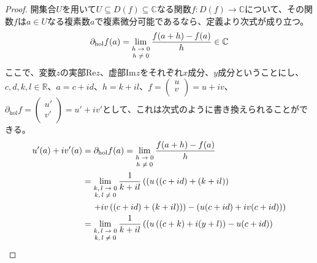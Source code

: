 \documentclass[dvipdfmx]{jsarticle}
\begin{document}
\begin{proof}
開集合$U$を用いて$U \subseteq D(f) \subseteq \mathbb{C}$なる関数$f:D(f) \rightarrow \mathbb{C}$について、その関数$f$は$a \in U$なる複素数$a$で複素微分可能であるなら、定義より次式が成り立つ。
\begin{align*}
\partial_{\mathrm{hol}}f(a) = \lim_{\scriptsize \begin{matrix}
h \rightarrow 0 \\
h \neq 0 \\
\end{matrix}}\frac{f(a + h) - f(a)}{h} \in \mathbb{C}
\end{align*}
ここで、変数$z$の実部$\mathrm{Re}z$、虚部$\mathrm{Im}z$をそれぞれ$x$成分、$y$成分ということにし、$c,d,k,l \in \mathbb{R}$、$a = c + id$、$h = k + il$、$f = \begin{pmatrix}
u \\
v \\
\end{pmatrix} = u + iv$、$\partial_{\mathrm{hol}}f = \begin{pmatrix}
u' \\
v' \\
\end{pmatrix} = u' + iv'$として、これは次式のように書き換えられることができる。
\begin{align*}
u'(a) + iv'(a) &= \partial_{\mathrm{hol}}f(a) = \lim_{\scriptsize \begin{matrix}
h \rightarrow 0 \\
h \neq 0 \\
\end{matrix}}\frac{f(a + h) - f(a)}{h}\\
&= \lim_{\scriptsize \begin{matrix}
k,l \rightarrow 0 \\
k,l \neq 0 \\
\end{matrix}}\frac{1}{k + il}\left( \left( u\left( (c + id) + (k + il) \right) \right. \right. \\
&\quad  \left.  \left.+ iv\left( (c + id) + (k + il) \right) \right) - \left( u(c + id) + iv(c + id) \right) \right)\\
&= \lim_{\scriptsize \begin{matrix}
k,l \rightarrow 0 \\
k,l \neq 0 \\
\end{matrix}}\frac{1}{k + il}\left( \left( u\left( (c + k) + i(y + l) \right) - u(c + id) \right) \right. \\

\end{align*}
\end{proof}
\end{document}
